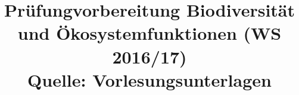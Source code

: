 \documentclass[12pt,a4paper]{article}
\title{\Huge\textbf{Prüfungvorbereitung Biodiversität und Ökosystemfunktionen (WS 2016/17)} \\ Quelle: Vorlesungsunterlagen}
\author{}
\date{}
\begin{document}
\begin{titlepage}

\maketitle
\thispagestyle{empty}
\end{titlepage}
\newpage

\begin{titlepage}
\tableofcontents
\thispagestyle{empty}
\end{titlepage}
\newpage



\newpage



\newpage



\newpage



\newpage



\newpage



\newpage



\newpage



\newpage



\newpage



\newpage



\newpage



\newpage



\newpage



\newpage


\end{document}
